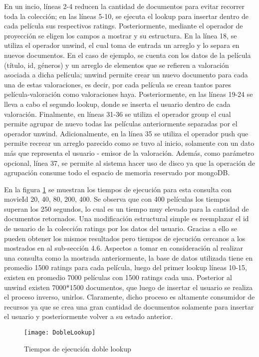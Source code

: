 \documentclass[conference,compsoc]{sty/IEEEtran}
\begin{document}
En un incio, líneas 2-4 reducen la cantidad de documentos para evitar recorrer toda la colección; en las líneas 5-10, se ejecuta el lookup para insertar dentro de cada película sus respectivos ratings. Posteriormente, mediante el operador de proyección se eligen los campos a mostrar y su estructura. En la línea 18, se utiliza el operador unwind, el cual toma de entrada un arreglo y lo separa en nuevos documentos. En el caso de ejemplo, se cuenta con los datos de la película (título, id, géneros) y un arreglo de elementos que se refieren a valoración asociada a dicha película; unwind permite crear un nuevo documento para cada una de estas valoraciones, es decir, por cada película se crean tantos pares película-valoración como valoraciones haya. Posteriormente, en las líneas 19-24 se lleva a cabo el segundo lookup, donde se inserta el usuario dentro de cada valoración. Finalmente, en líneas 31-36 se utiliza el operador group el cual permite agrupar de nuevo todas las películas anteriormente separadas por el operador unwind. Adicionalmente, en la línea 35 se utiliza el operador push que permite recrear  un arreglo parecido como se tuvo al inicio, solamente con un dato más que representa el usuario - emisor de la valoración. Además, como parámetro opcional, línea 37, se permite al sistema hacer uso de disco ya que la operación de agrupación consume todo el espacio de memoria reservado por mongoDB.  \par 

En la figura \ref{fig:doubleJoinTiempos} se muestran los tiempos de ejecución para esta consulta con movieId 20, 40, 80, 200, 400. Se observa que con 400 películas los tiempos superan los 250 segundos, lo cual es un tiempo muy elevado para la cantidad de documentos retornados. Una modificación estructural simple es reemplazar el id de usuario de la colección ratings por los datos del usuario. Gracias a ello se pueden obtener los mismos resultados pero tiempos de ejecución cercanos a los mostrados en al sub-sección 4.6.
Aspectos a tomar en consideración al realizar una consulta como la mostrada anteriormente, la base de datos utilizada tiene en promedio 1500 ratings para cada película, luego del primer lookup líneas 10-15, existen en promedio 7000 películas con 1500 ratings cada una. Posterior al unwind existen 7000*1500 documentos, que luego de insertar el usuario se realiza el proceso inverso, unirlos. Claramente, dicho proceso es altamente consumidor de recursos ya que se crea una gran cantidad de documentos solamente para insertar el usuario y posteriormente volver a su estado anterior. 
\begin{figure}
\begin{center}
\texttt{[image: DobleLookup]}
\end{center}
\caption{Tiempos de ejecución doble lookup} 
\label{fig:doubleJoinTiempos}
\end{figure}
\end{document}
